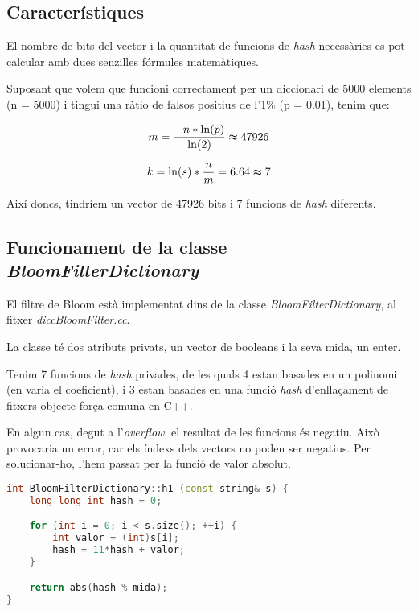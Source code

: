 \documentclass[titlepage]{article}
\begin{document}
\subsection{Característiques}
El nombre de bits del vector i la quantitat de funcions de \textit{hash} necessàries es pot calcular amb dues senzilles fórmules matemàtiques.
\newline\par
Suposant que volem que funcioni correctament per un diccionari de 5000 elements (n = 5000) i tingui una ràtio de falsos positius de l'1\% (p = 0.01), tenim que:

\[m = \frac{-n * \ln(p)}{\ln(2)} \thickapprox 47926\]

\[k = \ln(s) * \frac{n}{m} = 6.64 \thickapprox 7\]

Així doncs, tindríem un vector de 47926 bits i 7 funcions de \textit{hash} diferents.

\subsection{Funcionament de la classe \textit{BloomFilterDictionary}}
El filtre de Bloom està implementat dins de la classe \textit{BloomFilterDictionary}, al fitxer \textit{diccBloomFilter.cc}.
\newline\par
La classe té dos atributs privats, un vector de booleans i la seva mida, un enter.
\newline\par
Tenim 7 funcions de \textit{hash} privades, de les quals 4 estan basades en un polinomi (en varia el coeficient), i 3 estan basades en una funció \textit{hash} d'enllaçament de fitxers objecte força comuna en C++.
\newline\par
En algun cas, degut a l'\textit{overflow}, el resultat de les funcions és negatiu. Això provocaria un error, car els índexs dels vectors no poden ser negatius. Per solucionar-ho, l'hem passat per la funció de valor absolut.

\begin{lstlisting}[language=C++, caption=Primer tipus de funció de hash]
int BloomFilterDictionary::h1 (const string& s) {
    long long int hash = 0;

    for (int i = 0; i < s.size(); ++i) {
        int valor = (int)s[i];
        hash = 11*hash + valor;
    }

    return abs(hash % mida);
}
\end{lstlisting}
\end{document}
